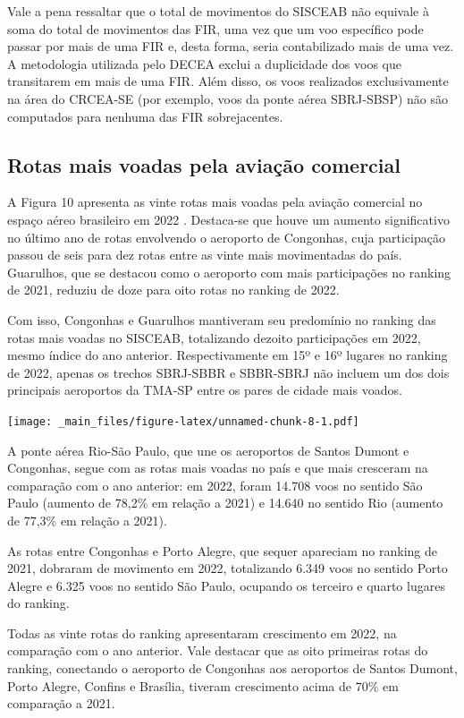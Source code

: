 \documentclass[
]{book}
\begin{document}
Vale a pena ressaltar que o total de movimentos do SISCEAB não equivale à soma do total de movimentos das FIR, uma vez que um voo específico pode passar por mais de uma FIR e, desta forma, seria contabilizado mais de uma vez. A metodologia utilizada pelo DECEA exclui a duplicidade dos voos que transitarem em mais de uma FIR. Além disso, os voos realizados exclusivamente na área do CRCEA-SE (por exemplo, voos da ponte aérea SBRJ-SBSP) não são computados para nenhuma das FIR sobrejacentes.

\hypertarget{rotas-mais-voadas-pela-aviauxe7uxe3o-comercial}{%
\subsection{Rotas mais voadas pela aviação comercial}\label{rotas-mais-voadas-pela-aviauxe7uxe3o-comercial}}

A Figura 10 apresenta as vinte rotas mais voadas pela aviação comercial no espaço aéreo brasileiro em 2022 . Destaca-se que houve um aumento significativo no último ano de rotas envolvendo o aeroporto de Congonhas, cuja participação passou de seis para dez rotas entre as vinte mais movimentadas do país. Guarulhos, que se destacou como o aeroporto com mais participações no ranking de 2021, reduziu de doze para oito rotas no ranking de 2022.

Com isso, Congonhas e Guarulhos mantiveram seu predomínio no ranking das rotas mais voadas no SISCEAB, totalizando dezoito participações em 2022, mesmo índice do ano anterior. Respectivamente em 15º e 16º lugares no ranking de 2022, apenas os trechos SBRJ-SBBR e SBBR-SBRJ não incluem um dos dois principais aeroportos da TMA-SP entre os pares de cidade mais voados.

\texttt{[image: \_main\_files/figure-latex/unnamed-chunk-8-1.pdf]}

A ponte aérea Rio-São Paulo, que une os aeroportos de Santos Dumont e Congonhas, segue com as rotas mais voadas no país e que mais cresceram na comparação com o ano anterior: em 2022, foram 14.708 voos no sentido São Paulo (aumento de 78,2\% em relação a 2021) e 14.640 no sentido Rio (aumento de 77,3\% em relação a 2021).

As rotas entre Congonhas e Porto Alegre, que sequer apareciam no ranking de 2021, dobraram de movimento em 2022, totalizando 6.349 voos no sentido Porto Alegre e 6.325 voos no sentido São Paulo, ocupando os terceiro e quarto lugares do ranking.

Todas as vinte rotas do ranking apresentaram crescimento em 2022, na comparação com o ano anterior. Vale destacar que as oito primeiras rotas do ranking, conectando o aeroporto de Congonhas aos aeroportos de Santos Dumont, Porto Alegre, Confins e Brasília, tiveram crescimento acima de 70\% em comparação a 2021.
\end{document}
